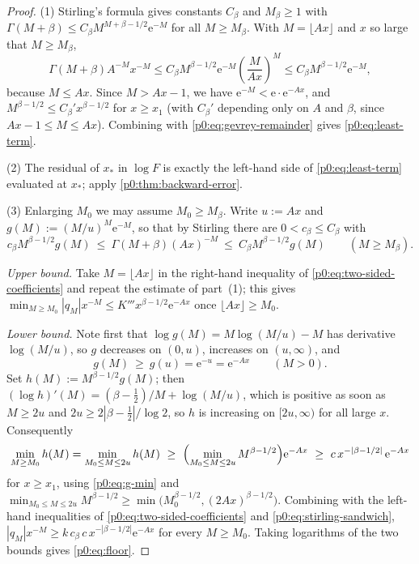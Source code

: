 \documentclass[11pt,a4paper,oneside]{book}
\theoremstyle{plain}
\theoremstyle{definition}
\theoremstyle{remark}
\newcommand{\e}{\mathrm{e}}
\begin{document}
\begin{proof}
(1) Stirling's formula gives constants $C_\beta$ and $M_\beta\ge1$ with
$\Gamma(M+\beta)\le C_\beta M^{M+\beta-1/2}\e^{-M}$ for all $M\ge M_\beta$.
With $M=\lfloor Ax\rfloor$ and $x$ so large that $M\ge M_\beta$,
\[
 \Gamma(M+\beta)A^{-M}x^{-M}
 \le C_\beta M^{\beta-1/2}\e^{-M}\left(\frac{M}{Ax}\right)^{M}
 \le C_\beta M^{\beta-1/2}\e^{-M},
\]
because $M\le Ax$.  Since $M>Ax-1$, we have $\e^{-M}<\e\cdot\e^{-Ax}$, and
$M^{\beta-1/2}\le C_\beta'x^{\beta-1/2}$ for $x\ge x_1$ (with
$C_\beta'$ depending only on $A$ and $\beta$, since
$Ax-1\le M\le Ax$).  Combining with \eqref{p0:eq:gevrey-remainder} gives
\eqref{p0:eq:least-term}.

(2) The residual of $x_\ast$ in $\log F$ is exactly the left-hand side of
\eqref{p0:eq:least-term} evaluated at $x_\ast$; apply
\cref{p0:thm:backward-error}.

(3) Enlarging $M_0$ we may assume $M_0\ge M_\beta$.  Write $u:=Ax$ and
$g(M):=(M/u)^{M}\e^{-M}$, so that by Stirling there are $0<c_\beta\le C_\beta$
with
\begin{equation}\label{p0:eq:stirling-sandwich}
 c_\beta M^{\beta-1/2}g(M)\ \le\ \Gamma(M+\beta)(Ax)^{-M}
 \ \le\ C_\beta M^{\beta-1/2}g(M)
 \qquad(M\ge M_\beta).
\end{equation}

\emph{Upper bound.}  Take $M=\lfloor Ax\rfloor$ in the right-hand inequality of
\eqref{p0:eq:two-sided-coefficients} and repeat the estimate of part~(1); this
gives $\min_{M\ge M_0}|q_M|x^{-M}\le K'''x^{\beta-1/2}\e^{-Ax}$ once
$\lfloor Ax\rfloor\ge M_0$.

\emph{Lower bound.}  Note first that $\log g(M)=M\log(M/u)-M$ has derivative
$\log(M/u)$, so $g$ decreases on $(0,u)$, increases on $(u,\infty)$, and
\begin{equation}\label{p0:eq:g-min}
 g(M)\ \ge\ g(u)=\e^{-u}=\e^{-Ax}\qquad(M>0).
\end{equation}
Set $h(M):=M^{\beta-1/2}g(M)$; then
$(\log h)'(M)=(\beta-\tfrac12)/M+\log(M/u)$, which is positive as soon as
$M\ge2u$ and $2u\ge2|\beta-\tfrac12|/\log2$, so $h$ is increasing on
$[2u,\infty)$ for all large $x$.  Consequently
\[
 \min_{M\ge M_0}h(M)
 =\min_{M_0\le M\le2u}h(M)
 \ \ge\ \Bigl(\min_{M_0\le M\le2u}M^{\beta-1/2}\Bigr)\e^{-Ax}
 \ \ge\ c\,x^{-|\beta-1/2|}\,\e^{-Ax}
\]
for $x\ge x_1$, using \eqref{p0:eq:g-min} and
$\min_{M_0\le M\le2u}M^{\beta-1/2}\ge\min\bigl(M_0^{\beta-1/2},(2Ax)^{\beta-1/2}\bigr)$.
Combining with the left-hand inequalities of
\eqref{p0:eq:two-sided-coefficients} and \eqref{p0:eq:stirling-sandwich},
$|q_M|x^{-M}\ge k\,c_\beta\,c\,x^{-|\beta-1/2|}\e^{-Ax}$ for every
$M\ge M_0$.  Taking logarithms of the two bounds gives
\eqref{p0:eq:floor}.
\end{proof}
\end{document}
